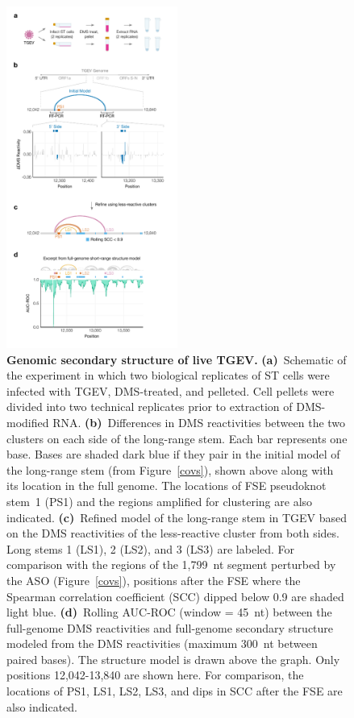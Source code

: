 \documentclass[main.tex]{subfiles}
\begin{document}
\begin{figure}[H]
	\includegraphics[width=0.5\textwidth]{../MainFigures/tgev/tgev.pdf}
	\caption{\textbf{Genomic secondary structure of live TGEV.} \textbf{(a)}~Schematic of the experiment in which two biological replicates of ST cells were infected with TGEV, DMS-treated, and pelleted. Cell pellets were divided into two technical replicates prior to extraction of DMS-modified RNA. \textbf{(b)}~Differences in DMS reactivities between the two clusters on each side of the long-range stem. Each bar represents one base. Bases are shaded dark blue if they pair in the initial model of the long-range stem (from Figure~\ref{covs}), shown above along with its location in the full genome. The locations of FSE pseudoknot stem~1 (PS1) and the regions amplified for clustering are also indicated. \textbf{(c)}~Refined model of the long-range stem in TGEV based on the DMS reactivities of the less-reactive cluster from both sides. Long stems 1 (LS1), 2 (LS2), and 3 (LS3) are labeled. For comparison with the regions of the 1,799~nt segment perturbed by the ASO (Figure~\ref{covs}), positions after the FSE where the Spearman correlation coefficient (SCC) dipped below 0.9 are shaded light blue. \textbf{(d)}~Rolling AUC-ROC (window = 45~nt) between the full-genome DMS reactivities and full-genome secondary structure modeled from the DMS reactivities (maximum 300~nt between paired bases). The structure model is drawn above the graph. Only positions 12,042-13,840 are shown here. For comparison, the locations of PS1, LS1, LS2, LS3, and dips in SCC after the FSE are also indicated.}
	\label{tgev}
\end{figure}
\end{document}
